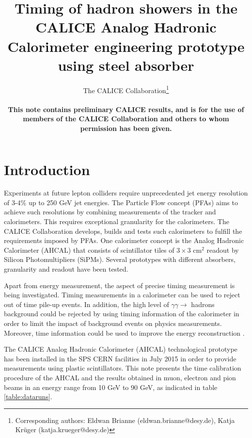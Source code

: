 \documentclass{JINST}
\title{Timing of hadron showers in the CALICE Analog Hadronic Calorimeter engineering prototype using steel absorber}
\author{The CALICE Collaboration\thanks{Corresponding authors: Eldwan Brianne (eldwan.brianne@desy.de), Katja Kr\"uger (katja.krueger@desy.de) } \\
\vspace{10 mm}

{\rm \bf \normalsize This note contains preliminary CALICE results, and is for the use of members of the CALICE Collaboration and others to whom permission has been given.}
}
\begin{document}
\section{Introduction}

Experiments at future lepton colliders require unprecedented jet energy resolution of 3-4\% up to 250 GeV jet energies. The Particle Flow concept (PFAs) aims to achieve such resolutions by combining measurements of the tracker and calorimeters. This requires exceptional granularity for the calorimeters. The CALICE Collaboration develops, builds and tests such calorimeters to fulfill the requirements imposed by PFAs. One calorimeter concept is the Analog Hadronic Calorimeter (AHCAL) that consists of scintillator tiles of $3\times3$ cm$^2$ readout by Silicon Photomultipliers (SiPMs). Several prototypes with different absorbers, granularity and readout have been tested.

Apart from energy measurement, the aspect of precise timing measurement is being investigated. Timing measurements in a calorimeter can be used to reject out of time pile-up events. In addition, the high level of $\gamma\gamma \rightarrow$ hadrons background could be rejected by using timing information of the calorimeter in order to limit the impact of background events on physics measurements. Moreover, time information could be used to improve the energy reconstruction \cite{Benaglia2016}.


The CALICE Analog Hadronic Calorimeter (AHCAL) technological prototype \cite{Sefkow:316196, Krueger:205287} has been installed in the SPS CERN facilities in July 2015 in order to provide measurements using plastic scintillators. This note presents the time calibration procedure of the AHCAL and the results obtained in muon, electron and pion beams in an energy range from 10 GeV to 90 GeV, as indicated in table \ref{table:dataruns}.
\end{document}
